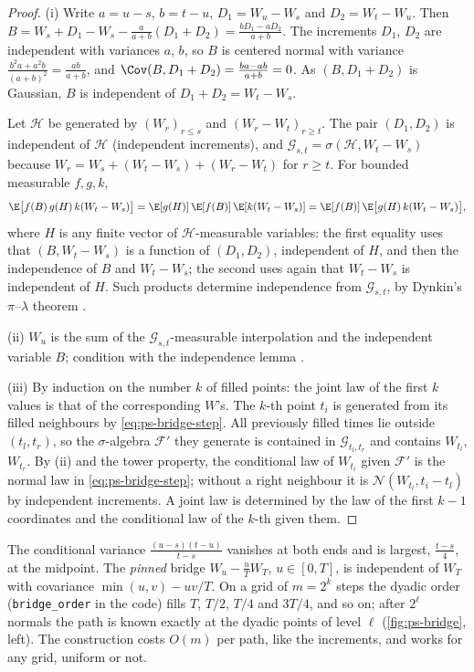 \begin{proof}
(i) Write $a=u-s$, $b=t-u$, $D_1=W_u-W_s$ and $D_2=W_t-W_u$. Then
$B=W_s+D_1-W_s-\frac{a}{a+b}(D_1+D_2)=\frac{bD_1-aD_2}{a+b}$. The increments $D_1$, $D_2$
are independent with variances $a$, $b$, so $B$ is centered normal with variance
$\frac{b^2a+a^2b}{(a+b)^2}=\frac{ab}{a+b}$, and
$\Cov(B,D_1+D_2)=\frac{ba-ab}{a+b}=0$. As $(B,D_1+D_2)$ is Gaussian, $B$ is independent
of $D_1+D_2=W_t-W_s$.

Let $\mathcal H$ be generated by $(W_r)_{r\le s}$ and $(W_r-W_t)_{r\ge t}$. The pair
$(D_1,D_2)$ is independent of $\mathcal H$ (independent increments), and $\mathcal G_{s,t}=\sigma(\mathcal H,W_t-W_s)$ because
$W_r=W_s+(W_t-W_s)+(W_r-W_t)$ for $r\ge t$. For bounded measurable $f,g,k$,
\[
  \E\big[f(B)\,g(H)\,k(W_t-W_s)\big]=\E[g(H)]\,\E[f(B)]\,\E[k(W_t-W_s)]
  =\E[f(B)]\,\E\big[g(H)\,k(W_t-W_s)\big],
\]
where $H$ is any finite vector of $\mathcal H$-measurable variables: the first equality
uses that $(B,W_t-W_s)$ is a function of $(D_1,D_2)$, independent of $H$, and then the
independence of $B$ and $W_t-W_s$; the second uses again that $W_t-W_s$ is independent of
$H$. Such products determine independence from $\mathcal G_{s,t}$, by Dynkin's
$\pi$--$\lambda$ theorem \citep[Section~2.1]{durrett}.

(ii) $W_u$ is the sum of the $\mathcal G_{s,t}$-measurable interpolation and the
independent variable $B$; condition with the independence lemma
\citep[Lemma~2.3.4]{shreve2}.

(iii) By induction on the number $k$ of filled points: the joint law of the first $k$
values is that of the corresponding $W$'s. The $k$-th point $t_i$ is generated from its
filled neighbours by \eqref{eq:ps-bridge-step}. All previously filled times lie outside
$(t_l,t_r)$, so the $\sigma$-algebra $\mathcal F'$ they generate is contained in
$\mathcal G_{t_l,t_r}$ and contains $W_{t_l}$, $W_{t_r}$. By (ii) and the tower property, the
conditional law of $W_{t_i}$ given $\mathcal F'$ is the normal law in
\eqref{eq:ps-bridge-step}; without a right neighbour it is $\mathcal N(W_{t_l},t_i-t_l)$ by
independent increments. A joint law is determined by the law of the first $k-1$
coordinates and the conditional law of the $k$-th given them.
\end{proof}

The conditional variance $\frac{(u-s)(t-u)}{t-s}$ vanishes at both ends and is largest,
$\frac{t-s}4$, at the midpoint. The \emph{pinned} bridge $W_u-\frac uTW_T$, $u\in[0,T]$,
is independent of $W_T$ with covariance $\min(u,v)-uv/T$. On a grid of $m=2^k$ steps the
dyadic order (\texttt{bridge\_order} in the code) fills $T$, $T/2$, $T/4$ and $3T/4$, and
so on; after $2^\ell$ normals the path is known exactly at the dyadic points of level
$\ell$ (\cref{fig:ps-bridge}, left). The construction costs $O(m)$ per path, like the
increments, and works for any grid, uniform or not.

